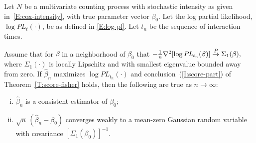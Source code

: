 \documentclass[final]{statsoc}
\begin{document}
\begin{theorem}\label{T:consistency}
    Let $N$ be a multivariate counting process with stochastic
    intensity as given in~\eqref{E:cox-intensity}, with true parameter
    vector $\beta_0$.  Let the log partial likelihood,
    $\log \mathit{PL}_t(\cdot)$, be as defined in \eqref{E:log-pl}.
    Let $t_n$ be the sequence of interaction times.

    Assume that for $\beta$ in a
    neighborhood of $\beta_0$ that
    \(
        -\tfrac{1}{n} \nabla^2 [ \log \mathit{PL}_{t_n}(\beta)]
            \overset{\mathit{P}}{\to} \Sigma_1(\beta),
    \)
    where $\Sigma_1(\cdot)$ is locally Lipschitz and with smallest
    eigenvalue bounded away from zero.
    If $\hat \beta_n$ maximizes $\log \mathit{PL}_{t_n}(\cdot)$ and
    conclusion~(\ref{I:score-part}) of Theorem~\ref{T:score-fisher} holds,
    then the following are true as $n\to\infty$:
    \begin{enumerate}[(i)]
        \item $\hat \beta_n$ is a consistent estimator of $\beta_0$;
        \item $\sqrt{n} \, (\hat \beta_n - \beta_0)$ converges weakly
            to a mean-zero Gaussian random variable with covariance
            $[\Sigma_1(\beta_0)]^{-1}$.
    \end{enumerate}
\end{theorem}
\end{document}
